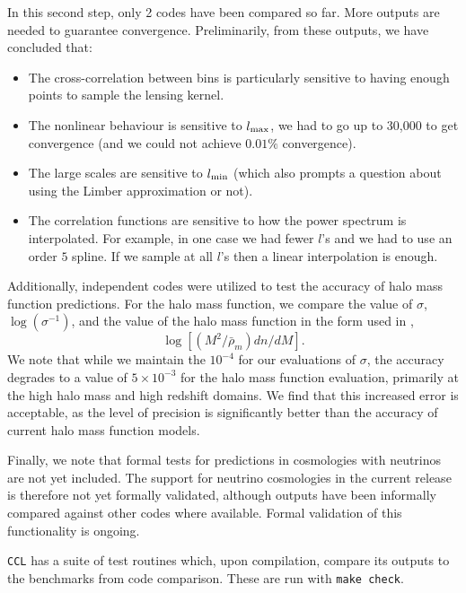 \documentclass[\docopts]{\docclass}
\begin{document}
In this second step, only 2 codes have been compared so far. More outputs are needed to guarantee convergence. Preliminarily, from these outputs, we have concluded that:
\begin{itemize}
\item The cross-correlation between bins is particularly sensitive to having enough points to sample the lensing kernel.
\item The nonlinear behaviour is sensitive to $l_{\rm max}$, we had to go up to 30,000 to get convergence (and we could not achieve $0.01\%$ convergence).
\item The large scales are sensitive to $l_{\rm min}$ (which also prompts a question about using the Limber approximation or not).
\item The correlation functions are sensitive to how the power spectrum is interpolated. For example, in one case we had fewer $l$'s and we had to use an order $5$ spline. If we sample at all $l$'s then a linear interpolation is enough.
\end{itemize}

Additionally, independent codes were utilized to test the accuracy of halo mass function predictions. For the halo mass function, we compare the value of $\sigma$, $\log(\sigma^{-1})$, and the value of the halo mass function in the form used in \citep{Tinker2008},
\begin{equation}
\log[(M^2/\bar{\rho}_m)dn/dM].
\end{equation}
We note that while we maintain the $10^{-4}$ for our evaluations of $\sigma$, the accuracy degrades to a value of $5\times10^{-3}$ for the halo mass function evaluation, primarily at the high halo mass and high redshift domains. We find that this increased error is acceptable, as the level of precision is significantly better than the accuracy of current halo mass function models.

Finally, we note that formal tests for predictions in cosmologies with neutrinos are not yet included. The support for neutrino cosmologies in the current release is therefore not yet formally validated, although outputs have been informally compared against other codes where available. Formal validation of this functionality is ongoing.

{\tt CCL} has a suite of test routines which, upon compilation, compare its outputs to the benchmarks from code comparison. These are run with {\tt make check}.
\end{document}
